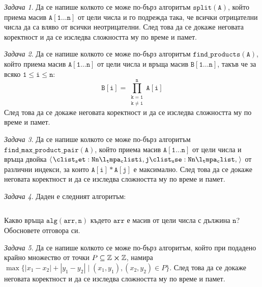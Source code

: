 \documentclass{article}
\theoremstyle{definition}
\theoremstyle{plain}
\theoremstyle{remark}
\newtheorem{problem}{Задача}
\theoremstyle{definition}
\begin{document}
\begin{problem}
Да се напише колкото се може по-бърз алгоритъм $\mathtt{split(A)}$, който приема масив $\mathtt{A[1 \dots n]}$ от цели числа и го подрежда така, че всички отрицателни числа да са вляво от всички неотрицателни.
След това да се докаже неговата коректност и да се изследва сложността му по време и памет.
\end{problem}

\begin{problem}
Да се напише колкото се може по-бърз алгоритъм $\mathtt{find\_products(A)}$, който приема масив $\mathtt{A[1 \dots n]}$ от цели числа и връща масив $\mathtt{B[1 \dots n]}$, такъв че за всяко $\mathtt{1 \leq i \leq n}$:
\[
  \mathtt{B[i] = \prod\limits_{\substack{\mathtt{k = 1} \\ \mathtt{k \neq i}}}^{n} A[i]}
\]
След това да се докаже неговата коректност и да се изследва сложността му по време и памет.
\end{problem}

\begin{problem}
Да се напише колкото се може по-бърз алгоритъм $\mathtt{find\_max\_product\_pair(A)}$, който приема масив $\mathtt{A[1 \dots n]}$ от цели числа и връща двойка $\mathtt{\opair{i, j}}$ от различни индекси, за които $\mathtt{A[i] * A[j]}$ е максимално.
След това да се докаже неговата коректност и да се изследва сложността му по време и памет.
\end{problem}

\begin{problem}
Даден е следният алгоритъм:
\inputminted[linenos]{c++}{algorithms/alg.cpp}
Какво връща $\mathtt{alg(arr, n)}$ където $\mathtt{arr}$ е масив от цели числа с дължина $\mathtt{n}$?
Обосновете отговора си.
\end{problem}

\begin{problem}
Да се напише колкото се може по-бърз алгоритъм, който при подадено крайно множество от точки $P \subseteq \mathbb{Z} \cross \mathbb{Z}$, намира $\max \{ |x_1 - x_2| + |y_1 - y_2| \mid (x_1, y_1), (x_2, y_2) \in P \}$.
След това да се докаже неговата коректност и да се изследва сложността му по време и памет.
\end{problem}
\end{document}
